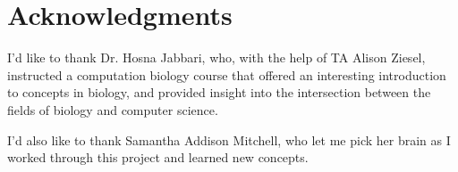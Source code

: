 \section*{Acknowledgments}

I'd like to thank Dr. Hosna Jabbari, who, with the help of TA Alison Ziesel, instructed a computation biology course that offered an interesting introduction to concepts in biology, and provided insight into the intersection between the fields of biology and computer science.

I'd also like to thank Samantha Addison Mitchell, who let me pick her brain as I worked through this project and learned new concepts.

